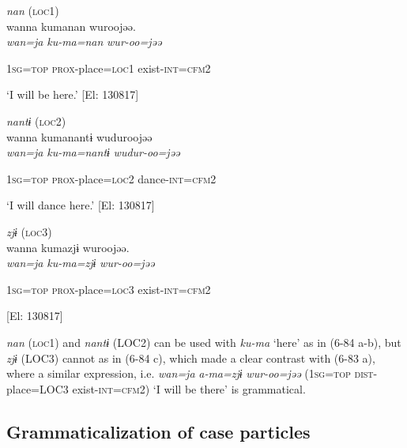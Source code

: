  \ea \textit{nan} (\textsc{loc}1)\\
{\TM}
\gll  wanna  kumanan  wuroojəə.\\

      \textit{wan=ja}  \textit{ku-ma=nan}  \textit{wur-oo=jəə}

      1\textsc{sg}=\textsc{top}  \textsc{prox}-place=\textsc{loc}1  exist-\textsc{int}=\textsc{cfm}2

\glt ‘I will be here.’ [El: 130817]

 \ex \textit{nantɨ} (\textsc{loc}2)\\
{\TM}
\gll  wanna  kumanantɨ  wuduroojəə\\

      \textit{wan=ja}  \textit{ku-ma=nantɨ}  \textit{wudur-oo=jəə}

      1\textsc{sg}=\textsc{top}  \textsc{prox}-place=\textsc{loc}2  dance-\textsc{int}=\textsc{cfm}2

\glt ‘I will dance here.’ [El: 130817]

 \ex \textit{zjɨ} (\textsc{loc}3)\\
{\TM}
\gll  *wanna  kumazjɨ  wuroojəə.\\

      \textit{wan=ja}  \textit{ku-ma=zjɨ}  \textit{wur-oo=jəə}

      1\textsc{sg}=\textsc{top}  \textsc{prox}-place=\textsc{loc}3  exist-\textsc{int}=\textsc{cfm}2

      [El: 130817]

\textit{nan} (\textsc{loc}1) and \textit{nantɨ} (LOC2) can be used with \textit{ku-ma} ‘here’ as in (6-84 a-b), but \textit{zjɨ} (LOC3) cannot as in (6-84 c), which made a clear contrast with (6-83 a), where a similar expression, i.e. \textit{wan=ja} \textit{a-ma=zjɨ} \textit{wur-oo=jəə} (1\textsc{sg}=\textsc{top} \textsc{dist}-place=LOC3 exist-\textsc{int}=\textsc{cfm}2) ‘I will be there’ is grammatical.

\subsection{Grammaticalization of case particles}

